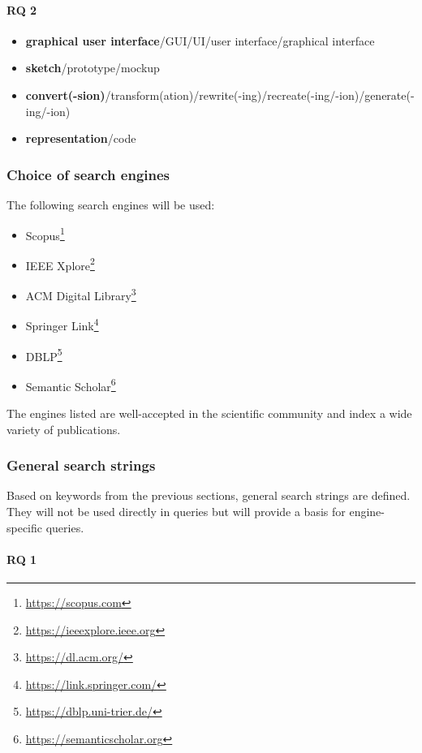 \paragraph{RQ 2}

\begin{itemize}
    \item \textbf{graphical user interface}/GUI/UI/user interface/graphical interface
    \item \textbf{sketch}/prototype/mockup
    \item \textbf{convert(-sion)}/transform(ation)/rewrite(-ing)/recreate(-ing/-ion)/generate(-ing/-ion)
    \item \textbf{representation}/code
\end{itemize}

\subsubsection{Choice of search engines}

The following search engines will be used:
\begin{itemize}
    \item Scopus\footnote{\url{https://scopus.com}}
    \item IEEE Xplore\footnote{\url{https://ieeexplore.ieee.org}}
    \item ACM Digital Library\footnote{\url{https://dl.acm.org/}}
    \item Springer Link\footnote{\url{https://link.springer.com/}}
    \item DBLP\footnote{\url{https://dblp.uni-trier.de/}}
    \item Semantic Scholar\footnote{\url{https://semanticscholar.org}}
\end{itemize}
The engines listed are well-accepted in the scientific community and index a wide variety of publications.

\subsubsection{General search strings}

Based on keywords from the previous sections, general search strings are defined.
They will not be used directly in queries but will provide a basis for engine-specific queries.

\paragraph{RQ 1}

